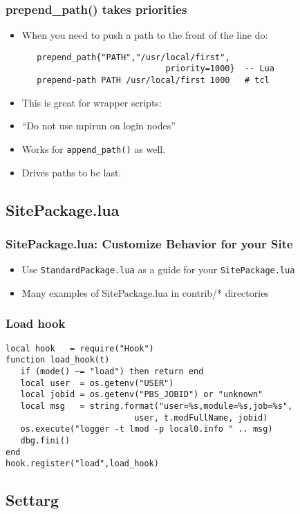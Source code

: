 \documentclass{beamer}
\begin{document}
\begin{frame}[fragile]
    \frametitle{prepend\_path() takes priorities}
  \begin{itemize}
    \item When you need to push a path to the front of the line do: 
    {\small
\begin{verbatim}
   prepend_path{"PATH","/usr/local/first",
                             priority=1000}  -- Lua
   prepend-path PATH /usr/local/first 1000   # tcl
\end{verbatim}
}
    \item This is great for wrapper scripts:
    \item ``Do not use mpirun on login nodes''
    \item Works for \texttt{append\_path()} as well.
    \item Drives paths to be last.
  \end{itemize}
\end{frame}

\subsection{SitePackage.lua}
\label{sec:sitePackage}

\begin{frame}[fragile]
    \frametitle{SitePackage.lua: Customize Behavior for your Site}
  \begin{itemize}
    \item Use \texttt{StandardPackage.lua} as a guide for your \texttt{SitePackage.lua}
    \item Many examples of SitePackage.lua in contrib/* directories
  \end{itemize}
\end{frame}

\begin{frame}[fragile]
    \frametitle{Load hook}
    {\small
\begin{verbatim}
local hook   = require("Hook")
function load_hook(t)
   if (mode() ~= "load") then return end
   local user  = os.getenv("USER")
   local jobid = os.getenv("PBS_JOBID") or "unknown"
   local msg   = string.format("user=%s,module=%s,job=%s",
                          user, t.modFullName, jobid)
   os.execute("logger -t lmod -p local0.info " .. msg)
   dbg.fini()
end
hook.register("load",load_hook)
\end{verbatim}
}
\end{frame}

\subsection{Settarg}
\label{sec:sitePackage}
\end{document}

